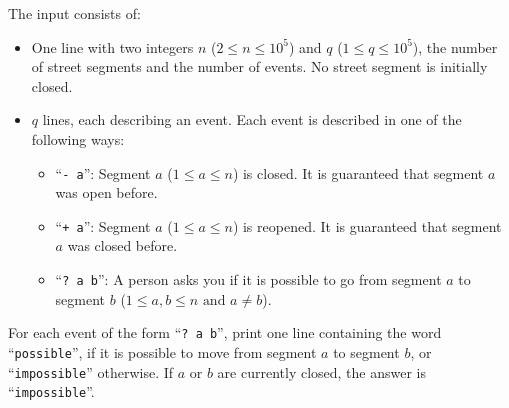 \begin{Input}
	The input consists of:
	\begin{itemize}
	  \item One line with two integers $n$ ($2 \leq n \leq 10^5$) and $q$ ($1
		  \leq q \leq 10^5$), the number of street segments and the number of events. No street segment is initially closed.
	  \item $q$ lines, each describing an event. Each event is described in one of the following ways:
	  \begin{itemize}
		  \item ``\texttt{- a}'': Segment $a$ ($1 \leq a \leq n$) is closed. It is guaranteed that segment $a$ was open before.
		  \item ``\texttt{+ a}'': Segment $a$ ($1 \leq a \leq n$) is reopened. It is guaranteed that segment $a$ was closed before.
	    \item ``\texttt{?~a b}'': A person asks you if it is possible to go from segment $a$ to segment $b$ ($1 \leq a, b \leq n \text{ and } a\neq b$).
	  \end{itemize}
	\end{itemize}
\end{Input}

\begin{Output}
For each event of the form ``\texttt{?~a b}'', print one line containing the word ``\texttt{possible}'', if it is possible to move from segment $a$ to segment $b$, or ``\texttt{impossible}'' otherwise.
If $a$ or $b$ are currently closed, the answer is ``\texttt{impossible}''.
\end{Output}
